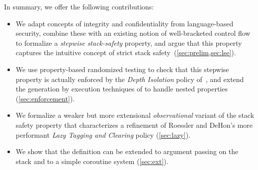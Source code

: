 \documentclass[acmsmall,review,anonymous]{acmart}\settopmatter{printfolios=true,printccs=false,printacmref=false}
\begin{document}

In summary, we offer the following contributions:

\begin{itemize}
\item We adapt concepts of integrity and confidentiality from language-based
security, combine these with an existing notion of well-bracketed
control flow to formalize a {\em stepwise stack-safety}
property, and argue that this property captures the intuitive concept of
strict stack
safety~(\cref{sec:prelim,sec:lse}).
\item We use property-based randomized testing to check that this stepwise
property is actually enforced by the {\em Depth Isolation} policy
of~\citet{DBLP:conf/sp/RoesslerD18}, and extend the generation by
execution techniques of \citet{TestingNI:ICFP} to handle nested
properties (\cref{sec:enforcement}).
\item We formalize a
weaker but more extensional \emph{observational} variant of the stack safety
property that characterizes a refinement of Roessler and DeHon's more
performant {\em Lazy Tagging and  Clearing} policy (\cref{sec:lazy}).
\item We show that the definition can be
extended to argument passing on the stack and to a simple coroutine system (\cref{sec:ext}).
\end{itemize}
\end{document}
